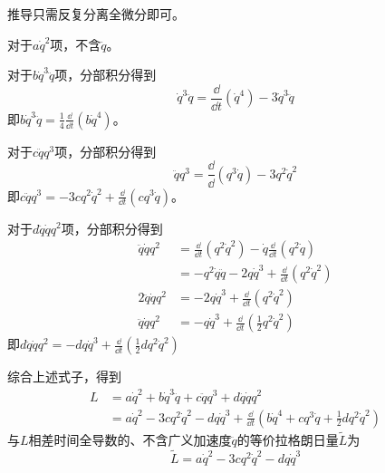\begin{solution}
	推导只需反复分离全微分即可。
	
	对于\(a\dot{q}^2\)项，不含\(\ddot{q}\)。
	
	对于\(b\dot{q}^3\ddot{q}\)项，分部积分得到
	\[\dot{q}^3\ddot{q}=\frac{\dd }{\dd t}(\dot{q}^4)-3\dot{q}^3\ddot{q}\]
	即\(b\dot{q}^3\ddot{q}=\frac{1}{4}\frac{\dd }{\dd t}(b\dot{q}^4)\)。
	
	对于\(c\ddot{q}q^3\)项，分部积分得到
	\[\ddot{q}q^3=\frac{\dd}{\dd}(q^3 \dot{q})-3 q^2 \dot{q}^2\]
	即\(c\ddot{q}q^3=-3c q^2 \dot{q}^2+\frac{\dd}{\dd t}(c q^3 \dot{q})\)。
	
	对于\(d\ddot{q}\dot{q}q^2\)项，分部积分得到
	\begin{align*}
		\ddot{q}\dot{q}q^2&=\frac{\dd}{\dd t}(q^2 \dot{q}^2)-\dot{q}\frac{\dd}{\dd t}(q^2 \dot{q})\\
		&=-q^2\dot{q}\ddot{q}-2 q \dot{q}^3+\frac{\dd}{\dd t}(q^2 \dot{q}^2)\\
		2 \ddot{q}\dot{q}q^2&=-2 q \dot{q}^3+\frac{\dd}{\dd t}(q^2 \dot{q}^2)\\
		\ddot{q}\dot{q}q^2 &=-q \dot{q}^3+\frac{\dd}{\dd t}(\frac{1}{2}q^2 \dot{q}^2)
	\end{align*}
	即\(d\ddot{q}\dot{q}q^2=-d q \dot{q}^3+\frac{\dd}{\dd t}(\frac{1}{2}d q^2 \dot{q}^2)\)
	
	综合上述式子，得到
	\begin{align*}
		L&=a\dot{q}^2+b\dot{q}^3\ddot{q}+c\ddot{q}q^3+d\ddot{q}\dot{q}q^2\\
		&=a\dot{q}^2-3c q^2 \dot{q}^2-d q \dot{q}^3+\frac{\dd}{\dd t}(b\dot{q}^4+c q^3 \dot{q}+\frac{1}{2}d q^2 \dot{q}^2)
	\end{align*}
	与\(L\)相差时间全导数的、不含广义加速度\(\ddot{q}\)的等价拉格朗日量\(\tilde{L}\)为
	\[\tilde{L}=a\dot{q}^2-3c q^2 \dot{q}^2-d q \dot{q}^3\]
\end{solution}




